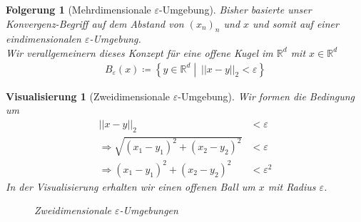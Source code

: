 \documentclass[11pt, twoside, a4paper]{article}
\theoremstyle{plain}
\newtheorem{folgerung}[blockelement]{Folgerung}
\newtheorem{visualisierung}[blockelement]{Visualisierung}
\newcommand{\set}[1]{\left\{#1\right\}}
\newcommand{\pair}[1]{\left(#1\right)}
\newcommand{\abs}[1]{\left|#1\right|}
\newcommand{\norm}[1]{\abs{\abs{#1}}}
\newcommand{\impl}[0]{\Rightarrow{}}
\newcommand{\definedas}[0]{\coloneqq}
\newcommand{\rgbcolor}[3]{rgb,255:red,#1;green,#2;blue,#3}
\newcommand{\R}{\mathbb{R}}
\begin{document}
    \begin{folgerung}[Mehrdimensionale $\varepsilon$-Umgebung]
        Bisher basierte unser Konvergenz-Begriff auf dem Abstand von $(x_n)_n$ und $x$ und somit auf einer eindimensionalen $\varepsilon$-Umgebung.\\
        Wir verallgemeinern dieses Konzept für eine offene Kugel im $\R^d$ mit $x\in\R^d$
        \begin{align*}
            B_\varepsilon(x) \definedas \set{y\in\R^d\middle |~ \norm{x-y}_2 < \varepsilon}
        \end{align*}
    \end{folgerung}

    \begin{visualisierung}[Zweidimensionale $\varepsilon$-Umgebung]
        Wir formen die Bedingung um
        \begin{align*}
            \norm{x-y}_2 &< \varepsilon\\
            \impl \sqrt{(x_1-y_1)^2 + (x_2 - y_2)^2} &< \varepsilon\\
            \impl \pair{x_1-y_1}^2 + \pair{x_2-y_2}^2 &< \varepsilon^2
        \end{align*}
        In der Visualisierung erhalten wir einen offenen Ball um $x$ mit Radius $\varepsilon$.

        \begin{figure}[H]
            \centering
            \caption{Zweidimensionale $\varepsilon$-Umgebungen}
        \end{figure}
    \end{visualisierung}
\end{document}
